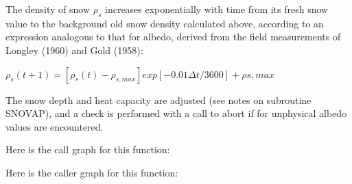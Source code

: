 The density of snow $\rho_s$ increases exponentially with time from its fresh snow value to the background old snow density calculated above, according to an expression analogous to that for albedo, derived from the field measurements of Longley (1960) and Gold (1958)\+:

$\rho_s (t+1) = [\rho_s (t) - \rho_{s,max} ] exp [-0.01 \Delta t/3600] + \rho{s,max}$

The snow depth and heat capacity are adjusted (see notes on subroutine S\+N\+O\+V\+A\+P), and a check is performed with a call to abort if for unphysical albedo values are encountered.

Here is the call graph for this function\+:




Here is the caller graph for this function\+:


